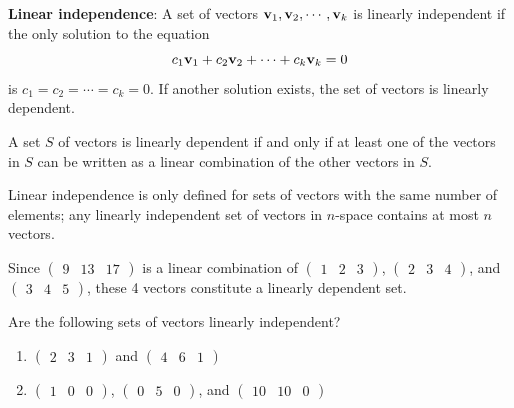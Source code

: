 \documentclass[]{book}
\providecommand{\tightlist}{%
  \setlength{\itemsep}{0pt}\setlength{\parskip}{0pt}}
\theoremstyle{definition}
\theoremstyle{definition}
\theoremstyle{definition}
\theoremstyle{remark}
\let\BeginKnitrBlock\begin \let\EndKnitrBlock\end
\begin{document}
\textbf{Linear independence}: A set of vectors
\({\bf v}_1, {\bf v}_2, \cdots , {\bf v}_k\) is linearly independent if
the only solution to the equation
\[c_1{\bf v}_1 + c_2{\bf v}_2 +  \cdots + c_k{\bf v}_k = 0\] is
\(c_1 = c_2 = \cdots = c_k = 0\). If another solution exists, the set of
vectors is linearly dependent.

A set \(S\) of vectors is linearly dependent if and only if at least one
of the vectors in \(S\) can be written as a linear combination of the
other vectors in \(S\).

Linear independence is only defined for sets of vectors with the same
number of elements; any linearly independent set of vectors in
\(n\)-space contains at most \(n\) vectors.

Since \(\begin{pmatrix}9 & 13 & 17 \end{pmatrix}\) is a linear
combination of \(\begin{pmatrix}1 & 2 & 3 \end{pmatrix}\),
\(\begin{pmatrix} 2 & 3& 4\end{pmatrix}\), and
\(\begin{pmatrix} 3 & 4 & 5 \end{pmatrix}\), these 4 vectors constitute
a linearly dependent set.

\BeginKnitrBlock{example}[Linear Independence]
\protect\hypertarget{exm:linearindep}{}{\label{exm:linearindep}
{} } Are the following sets of vectors
linearly independent?

\begin{enumerate}
\def\labelenumi{\arabic{enumi}.}
\tightlist
\item
  \(\begin{pmatrix}2 & 3 & 1 \end{pmatrix}\) and
  \(\begin{pmatrix}4 & 6 & 1 \end{pmatrix}\)
\item
  \(\begin{pmatrix}1 & 0 & 0 \end{pmatrix}\),
  \(\begin{pmatrix}0 & 5 & 0 \end{pmatrix}\), and
  \(\begin{pmatrix}10 & 10 & 0 \end{pmatrix}\)
\end{enumerate}
\EndKnitrBlock{example}
\end{document}
